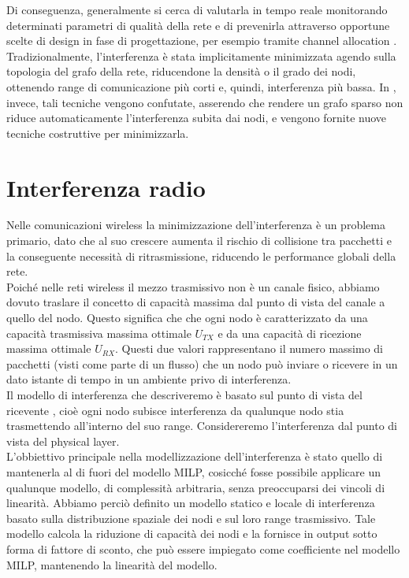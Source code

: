 Di  conseguenza, generalmente si cerca di valutarla in tempo reale monitorando determinati parametri di qualità della rete \cite{Halperin:2010:PPD:1851275.1851203,6151307} e di prevenirla attraverso opportune scelte di design in fase di progettazione, per esempio tramite channel allocation \cite{7383864}. \\
Tradizionalmente, l'interferenza è stata implicitamente minimizzata agendo sulla topologia del grafo della rete, riducendone la densità o il grado dei nodi, ottenendo range di comunicazione più corti e, quindi, interferenza più bassa. In \cite{burkhart2004does}, invece, tali tecniche vengono confutate, asserendo che rendere un grafo sparso non riduce automaticamente l'interferenza subita dai nodi, e vengono fornite nuove tecniche costruttive per minimizzarla. \\


\section{Interferenza radio}
Nelle comunicazioni wireless la minimizzazione dell'interferenza è un problema primario, dato che al suo crescere aumenta il rischio di collisione tra pacchetti e la conseguente necessità di ritrasmissione, riducendo le performance globali della rete. \\
Poiché nelle reti wireless il mezzo trasmissivo non è un canale fisico, abbiamo dovuto traslare il concetto di capacità massima dal punto di vista del canale a quello del nodo. Questo significa che che ogni nodo è caratterizzato da una capacità trasmissiva massima ottimale $U_{TX}$ e da una capacità di ricezione massima ottimale $U_{RX}$. Questi due valori rappresentano il numero massimo di pacchetti (visti come parte di un flusso) che un nodo può inviare o ricevere in un dato istante di tempo in un ambiente privo di interferenza. \\
Il modello di interferenza che descriveremo è basato sul punto di vista del ricevente \cite{Rickenbach05arobust}, cioè ogni nodo subisce interferenza da qualunque nodo stia trasmettendo all'interno del suo range. Considereremo l'interferenza dal punto di vista del physical layer. \\
L'obbiettivo principale nella modellizzazione dell'interferenza è stato quello di mantenerla al di fuori del modello MILP, cosicché fosse possibile applicare un qualunque modello, di complessità arbitraria, senza preoccuparsi dei vincoli di linearità.
Abbiamo perciò definito un modello statico e locale di interferenza basato sulla distribuzione spaziale dei nodi e sul loro range trasmissivo. Tale modello calcola la riduzione di capacità dei nodi e la fornisce in output sotto forma di fattore di sconto, che può essere impiegato come coefficiente nel modello MILP, mantenendo la linearità del modello.

